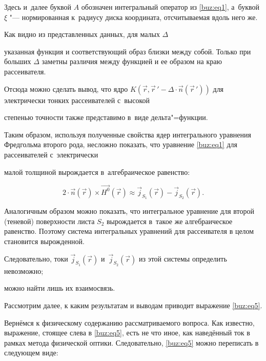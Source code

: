 Здесь и~далее буквой $A$ обозначен интегральный оператор из \eqref{buz:eq1}, а~буквой $\xi$ "--- нормированная к~радиусу диска координата, отсчитываемая вдоль него же.







Как видно из представленных данных, для малых $\Delta$

указанная функция и соответствующий образ близки между собой. Только при больших $\Delta$ заметны различия между функцией и ее образом на краю рассеивателя. 

Отсюда можно сделать вывод, что ядро $K(\vec{r},\vec{r}\,'-\Delta\cdot\vec{n}(\vec{r}\,'))$ для электрически тонких рассеивателей с~высокой

степенью точности также представимо в~виде дельта"=функции.



Таким образом, используя полученные свойства ядер интегрального уравнения Фредгольма второго рода, несложно показать, что уравнение \eqref{buz:eq1} для рассеивателей с~электрически 

малой толщиной вырождается в~алгебраическое равенство:

\begin{equation}

\label{buz:eq5}

2\cdot\vec{n}(\vec{r})\times\vec{H^0}(\vec{r})\approx\vec{j}_{S_1}(\vec{r})-\vec{j}_{S_2}(\vec{r}).

\end{equation}



Аналогичным образом можно показать, что интегральное уравнение для второй (теневой) поверхности листа $S_2$  вырождается в~такое же алгебраическое равенство. Поэтому система интегральных уравнений для рассеивателя в целом становится вырожденной.

Следовательно, токи $\vec{j}_{S_1}(\vec{r})$ и~$\vec{j}_{S_2}(\vec{r})$ из этой системы определить невозможно;

можно найти лишь их взаимосвязь.



\smallskip






Рассмотрим далее, к каким результатам и выводам приводит выражение \eqref{buz:eq5}.

Вернёмся к физическому содержанию рассматриваемого вопроса. Как известно, выражение, стоящее слева в \eqref{buz:eq5}, есть не что иное, как наведённый ток в рамках метода физической оптики. Следовательно, \eqref{buz:eq5} можно переписать в следующем виде:

